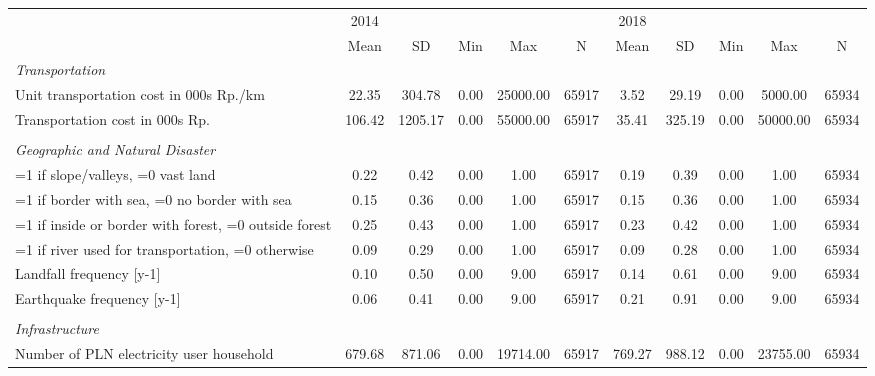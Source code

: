 \begin{tabular}{l*{2}{ccccc}}
\toprule
                &     2014&         &         &         &         &     2018&         &         &         &         \\
                &     Mean&       SD&      Min&      Max&        N&     Mean&       SD&      Min&      Max&        N\\
\midrule
\emph{Transportation}&         &         &         &         &         &         &         &         &         &         \\
Unit transportation cost in 000s Rp./km&    22.35&   304.78&     0.00& 25000.00&    65917&     3.52&    29.19&     0.00&  5000.00&    65934\\
Transportation cost in 000s Rp.&   106.42&  1205.17&     0.00& 55000.00&    65917&    35.41&   325.19&     0.00& 50000.00&    65934\\
\vspace{0.1em} \\ \emph{Geographic and Natural Disaster}&         &         &         &         &         &         &         &         &         &         \\
=1 if slope/valleys, =0 vast land&     0.22&     0.42&     0.00&     1.00&    65917&     0.19&     0.39&     0.00&     1.00&    65934\\
=1 if border with sea, =0 no border with sea&     0.15&     0.36&     0.00&     1.00&    65917&     0.15&     0.36&     0.00&     1.00&    65934\\
=1 if inside or border with forest, =0 outside forest&     0.25&     0.43&     0.00&     1.00&    65917&     0.23&     0.42&     0.00&     1.00&    65934\\
=1 if river used for transportation, =0 otherwise&     0.09&     0.29&     0.00&     1.00&    65917&     0.09&     0.28&     0.00&     1.00&    65934\\
Landfall frequency [y-1]&     0.10&     0.50&     0.00&     9.00&    65917&     0.14&     0.61&     0.00&     9.00&    65934\\
Earthquake frequency [y-1]&     0.06&     0.41&     0.00&     9.00&    65917&     0.21&     0.91&     0.00&     9.00&    65934\\
\vspace{0.1em} \\ \emph{Infrastructure}&         &         &         &         &         &         &         &         &         &         \\
Number of PLN electricity user household&   679.68&   871.06&     0.00& 19714.00&    65917&   769.27&   988.12&     0.00& 23755.00&    65934\\

\end{tabular}
